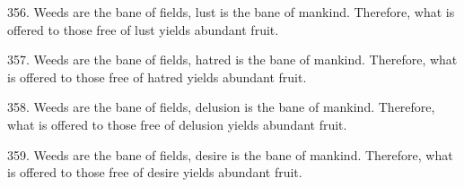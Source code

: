 356. Weeds are the bane of fields, lust is the bane of mankind. Therefore, what is offered to those free of lust yields abundant fruit.

357. Weeds are the bane of fields, hatred is the bane of mankind. Therefore, what is offered to those free of hatred yields abundant fruit.

358. Weeds are the bane of fields, delusion is the bane of mankind. Therefore, what is offered to those free of delusion yields abundant fruit.

359. Weeds are the bane of fields, desire is the bane of mankind. Therefore, what is offered to those free of desire yields abundant fruit.
